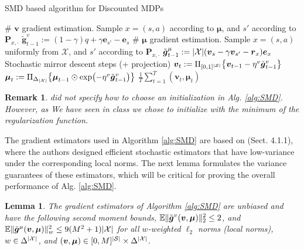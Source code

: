 \documentclass{article}
\newtheorem{lemma}{Lemma}
\newtheorem{remark}{Remark}
\DeclarePairedDelimiter\br{(}{)}%
\DeclarePairedDelimiter\brc{\{}{\}}%
\DeclarePairedDelimiter\abs{\lvert}{\rvert}%
\DeclarePairedDelimiter\norm{\lVert}{\rVert}%
\newcommand{\E}{\mathbb{E}}
\newcommand{\States}{\mathcal{S}}
\newcommand{\Actions}{\mathcal{A}}
\newcommand{\nSt}{{\abs{\States}}}
\newcommand{\nAct}{{\abs{\Actions}}}
\newcommand{\Pairs}{\mathcal{X}}
\newcommand{\nPairs}{{\abs{\mathcal{X}}}}
\newcommand{\Pb}{\boldsymbol{P}}
\newcommand{\rb}{\boldsymbol{r}}
\newcommand{\vb}{\boldsymbol{v}}
\newcommand{\eb}{\boldsymbol{e}}
\newcommand{\mub}{\boldsymbol{\mu}}
\newcommand{\gtild}{\tilde{\boldsymbol{g}}}
\begin{document}
\begin{algorithm}[t]
  \caption{SMD based algorithm for Discounted MDPs}
  \label{alg:TD0}
\begin{algorithmic}[1]
   \STATE {{\bfseries Initialize:} $\mub_0(x) := \frac{1}{\nPairs}, \forall x \in \Pairs$, and $\vb_0(s) := 0, 
   \forall s \in \States. $ }
       \STATE \# $\vb$ gradient estimation.
       \STATE  Sample $x=(s,a)$ according to $\mub$, and $s'$ according to $\Pb_{x,\cdot}$
       \STATE $\gtild^{v}_{t-1} := (1-\gamma) q + \gamma \eb_{s'} -  \eb_{s}$  
       \STATE \# $\mub$ gradient estimation.
       \STATE  Sample $x=(s,a)$ uniformly from $\Pairs$, and $s'$ according to $\Pb_{x,\cdot}$
       \STATE $\gtild^{\mu}_{t-1} := \nPairs \br*{\vb_s-\gamma \vb_{s'}- \rb_{x}} \eb_{x}$  
       \STATE Stochastic mirror descent steps (+ projection)
      \STATE $\vb_t := \Pi_{[0,1]^{\nSt}} \brc*{\vb_{t-1} - \eta^{v} \gtild^{v}_{t-1}} $ \label{algstep:v_update}
      \STATE $\mub_t := \Pi_{\Delta_{\nPairs}} \brc*{\mub_{t-1} \odot \exp \br*{- \eta^{v} \gtild^{v}_{t-1}}}  $
    \ENDFOR
     $ \frac{1}{T} \sum_{t=1}^{T} (\vb_t, \mub_t)$
\end{algorithmic} \label{alg:SMD}
\end{algorithm}

\begin{remark}
\citet{jin20efficiently} did not specify how to choose an initialization in Alg. \ref{alg:SMD}.
However, as We have seen in class we chose to initialize with the minimum of the regularization function.
\end{remark} 


The gradient estimators used in Algorithm \ref{alg:SMD} are based on \citet{carmon2017lower} (Sect. 4.1.1), where the authors designed efficient stochastic estimators that have low-variance under the corresponding local norms.
The next lemma formulates the variance guarantees of these estimators, which will be critical for proving the overall performance of Alg. \ref{alg:SMD}.

\begin{lemma} \label{lem:grad}
The gradient estimators of Algorithm \ref{alg:SMD}
are unbiased and have the following second moment bounds, $\E \norm{\gtild^v (\vb, \mub)}_2^2 \leq 2$, and $\E \norm{\gtild^\mu (\vb, \mub)}_w^2 \leq 9(M^2+1)\nPairs$ for all $w$-weighted $\ell_2$ norms (local norms),   $ w \in \Delta^\nPairs$, and $(\vb, \mub)\in [0,M]^\nSt \times \Delta^\nPairs$.
\end{lemma}
\end{document}
